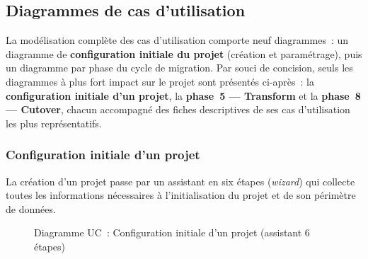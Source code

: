 \subsection{Diagrammes de cas d'utilisation}
\label{subsec:uc-global}

La modélisation complète des cas d'utilisation comporte neuf diagrammes~: un diagramme de \textbf{configuration initiale du projet} (création et paramétrage), puis un diagramme par phase du cycle de migration. Par souci de concision, seuls les diagrammes à plus fort impact sur le projet sont présentés ci-après~: la \textbf{configuration initiale d'un projet}, la \textbf{phase~5 --- Transform} et la \textbf{phase~8 --- Cutover}, chacun accompagné des fiches descriptives de ses cas d'utilisation les plus représentatifs.

\subsubsection*{Configuration initiale d'un projet}
\label{subsubsec:uc-setup}

La création d'un projet passe par un assistant en six étapes (\textit{wizard}) qui collecte toutes les informations nécessaires à l'initialisation du projet et de son périmètre de données.

\begin{figure}[H]
\centering
{}
\caption{Diagramme UC~: Configuration initiale d'un projet (assistant 6 étapes)}
\label{fig:uc-setup}
\end{figure}

